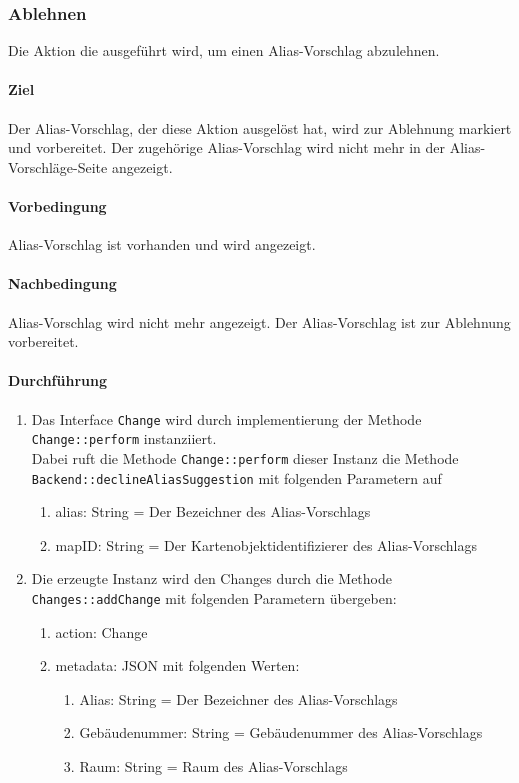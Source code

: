 \newpage
\subsubsection{Ablehnen}\label{AP_Aktionen_Alias_Vorschläge_Ablehnen}

Die Aktion die ausgeführt wird, um einen Alias-Vorschlag abzulehnen.

\paragraph*{Ziel}
Der Alias-Vorschlag, der diese Aktion ausgelöst hat, wird zur Ablehnung markiert und vorbereitet.
Der zugehörige Alias-Vorschlag wird nicht mehr in der Alias-Vorschläge-Seite angezeigt.

\paragraph*{Vorbedingung}
Alias-Vorschlag ist vorhanden und wird angezeigt.

\paragraph*{Nachbedingung}
Alias-Vorschlag wird nicht mehr angezeigt. Der Alias-Vorschlag ist zur Ablehnung vorbereitet.

\paragraph*{Durchführung}
\begin{enumerate}
    \item Das Interface \verb#Change# wird durch implementierung der Methode \verb#Change::perform# instanziiert. \\
          Dabei ruft die Methode \verb#Change::perform# dieser Instanz die Methode \verb#Backend::declineAliasSuggestion# mit folgenden Parametern auf \begin{enumerate}
              \item alias: String = Der Bezeichner des Alias-Vorschlags
              \item mapID: String = Der Kartenobjektidentifizierer des Alias-Vorschlags
          \end{enumerate}
    \item Die erzeugte Instanz wird den Changes durch die Methode \verb#Changes::addChange# mit folgenden Parametern übergeben: \begin{enumerate}
        \item action: Change
        \item metadata: JSON mit folgenden Werten: \begin{enumerate}
            \item Alias: String = Der Bezeichner des Alias-Vorschlags
            \item Gebäudenummer: String = Gebäudenummer des Alias-Vorschlags
            \item Raum: String = Raum des Alias-Vorschlags
        \end{enumerate}
    \end{enumerate}
\end{enumerate}